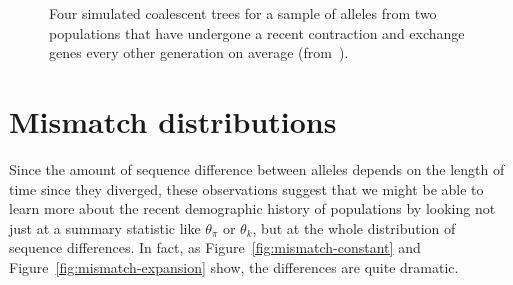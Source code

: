\begin{figure}
\begin{center}
\end{center}
\caption{Four simulated coalescent trees for a sample of alleles from
  two populations that have undergone a recent contraction and exchange
  genes every other generation on average
  (from~\cite{Harpending-etal-1998}).}\label{fig:coalescent-contraction} 
\end{figure}

\section*{Mismatch distributions}

Since the amount of sequence difference between alleles depends on the
length of time since they diverged, these observations suggest that we
might be able to learn more about the recent demographic history of
populations by looking not just at a summary statistic like
$\theta_\pi$ or $\theta_k$, but at the whole distribution of sequence
differences. In fact, as Figure~\ref{fig:mismatch-constant} and
Figure~\ref{fig:mismatch-expansion} show, the differences are quite
dramatic.

